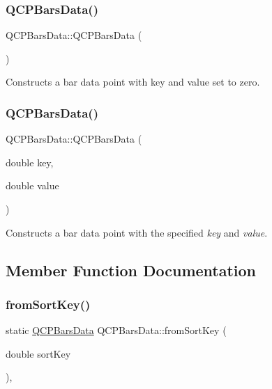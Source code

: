 \subsubsection{\texorpdfstring{QCPBarsData()}{QCPBarsData()}\hspace{0.1cm}{\footnotesize\ttfamily [1/2]}}
{\footnotesize\ttfamily Q\+C\+P\+Bars\+Data\+::\+Q\+C\+P\+Bars\+Data (\begin{DoxyParamCaption}{ }\end{DoxyParamCaption})}

Constructs a bar data point with key and value set to zero. \mbox{\label{class_q_c_p_bars_data_a4158816a69e2c675885f48afa2b5acc9}} 
\subsubsection{\texorpdfstring{QCPBarsData()}{QCPBarsData()}\hspace{0.1cm}{\footnotesize\ttfamily [2/2]}}
{\footnotesize\ttfamily Q\+C\+P\+Bars\+Data\+::\+Q\+C\+P\+Bars\+Data (\begin{DoxyParamCaption}\item[{double}]{key,  }\item[{double}]{value }\end{DoxyParamCaption})}

Constructs a bar data point with the specified {\itshape key} and {\itshape value}. 

\subsection{Member Function Documentation}
\mbox{\label{class_q_c_p_bars_data_ad170d4e90498005ec319338910252ba8}} 
\subsubsection{\texorpdfstring{fromSortKey()}{fromSortKey()}}
{\footnotesize\ttfamily static \mbox{\hyperlink{class_q_c_p_bars_data}{Q\+C\+P\+Bars\+Data}} Q\+C\+P\+Bars\+Data\+::from\+Sort\+Key (\begin{DoxyParamCaption}\item[{double}]{sort\+Key }\end{DoxyParamCaption})\hspace{0.3cm}{\ttfamily [inline]}, {\ttfamily [static]}}

